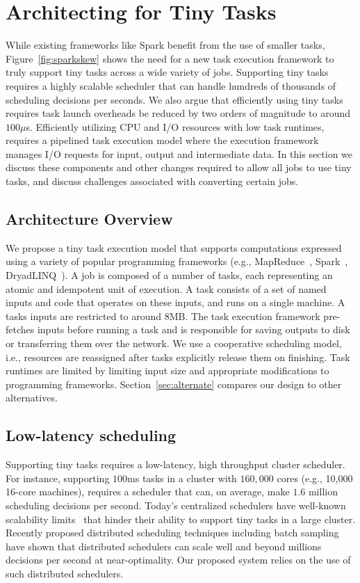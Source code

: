 \section{Architecting for Tiny Tasks}
\label{sec:architecture}
While existing frameworks like Spark benefit from the use of smaller tasks, Figure~\ref{fig:sparkskew}
shows the need for a new task execution framework to truly support tiny tasks across a wide
variety of jobs.
Supporting tiny tasks requires a highly scalable scheduler that can handle hundreds 
of thousands of scheduling decisions per seconds. We also argue that efficiently using
tiny tasks requires task launch overheads be reduced by two orders of magnitude to around $100\mu$s.
Efficiently utilizing CPU and I/O resources with low task runtimes, requires
a pipelined task execution model where the execution framework manages I/O
requests for input, output and intermediate data. In this section
we discuss these components and other changes required to allow all jobs to use
tiny tasks, and discuss challenges associated with converting certain jobs.

\subsection{Architecture Overview}
We propose a tiny task execution model that supports computations expressed using 
a variety of popular programming frameworks (e.g., MapReduce~\cite{dean2008mapreduce},
Spark~\cite{zaharia2010spark}, DryadLINQ~\cite{yu2008dryadlinq}). 
A job is composed of a number of tasks, each representing an atomic
and idempotent unit of execution. A task consists of a set of named inputs
and code that operates on these inputs, and runs on a single machine.
A tasks inputs are restricted to around 8MB. The task execution framework
pre-fetches inputs before running a task and is responsible for saving
outputs to disk or transferring them over the network.  We use a cooperative 
scheduling model, i.e., resources are reassigned after tasks explicitly release 
them on finishing. Task runtimes are limited by limiting input size and
appropriate modifications to programming frameworks. Section~\ref{sec:alternate} 
compares our design to other alternatives.

\subsection{Low-latency scheduling}
Supporting tiny tasks requires a low-latency, high throughput cluster scheduler.
For instance, supporting $100$ms tasks in a cluster with $160,000$ cores
(e.g., 10,000 16-core machines),
requires a scheduler that can, on average, make $1.6$ million scheduling
decisions per second.
Today's centralized schedulers have well-known scalability
limits~\cite{wilkesberkeley} that
hinder their ability to support tiny tasks in a large cluster.
Recently proposed distributed scheduling techniques including batch
sampling~\cite{ousterhoutbatch} have shown that distributed schedulers
can scale well and beyond millions decisions per second at near-optimality.
Our proposed system relies on the use of such distributed schedulers.

